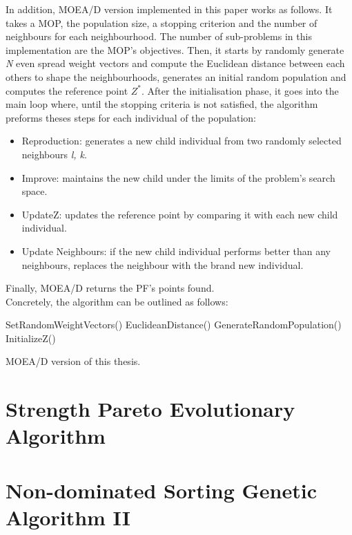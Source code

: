 In addition, MOEA/D version implemented in this paper works as follows. It takes a MOP, the population size, a stopping criterion and the number of neighbours for each neighbourhood. The number of sub-problems in this implementation are the MOP's objectives. Then, it starts by randomly generate \textit{N} even spread weight vectors and compute the Euclidean distance between each others to shape the neighbourhoods, generates an initial random population and computes the reference point $Z^{*}$. After the initialisation phase, it goes into the main loop where, until the stopping criteria is not satisfied, the algorithm preforms theses steps for each individual of the population:
\begin{itemize}
  \item Reproduction: generates a new child individual from two randomly selected neighbours \textit{l, k}.
  \item Improve: maintains the new child under the limits of the problem's search space.
  \item UpdateZ: updates the reference point by comparing it with each new child individual.
  \item Update Neighbours: if the new child individual performs better than any neighbours, replaces the neighbour with the brand new individual.
\end{itemize}
Finally, MOEA/D returns the PF's points found. \\

Concretely, the algorithm can be outlined as follows: \\

\begin{algorithm}[H]
  SetRandomWeightVectors()\;
  EuclideanDistance()\;
  GenerateRandomPopulation()\;
  InitializeZ()\;
  \caption{MOEA/D version of this thesis.}
\end{algorithm}
\section{Strength Pareto Evolutionary Algorithm}
\section{Non-dominated Sorting Genetic Algorithm II}

